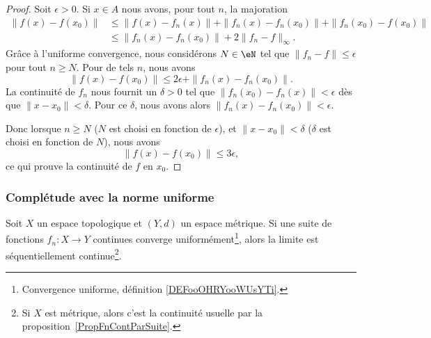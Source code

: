 \begin{proof}
	Soit \( \epsilon>0\). Si \( x\in A\) nous avons, pour tout \( n\), la majoration
	\begin{subequations}
		\begin{align}
			\| f(x)-f(x_0) \| & \leq \| f(x)-f_n(x) \|+\| f_n(x)-f_n(x_0) \|+\| f_n(x_0)-f(x_0) \| \\
			                  & \leq\| f_n(x)-f_n(x_0) \|+2\| f_n-f \|_{\infty}.
		\end{align}
	\end{subequations}
	Grâce à l'uniforme convergence, nous considérons \(N\in \eN\) tel que \( \| f_n-f \|\leq \epsilon\) pour tout \( n\geq N\). Pour de tels \( n\), nous avons
	\begin{equation}
		\| f(x)-f(x_0) \|\leq 2\epsilon+\| f_n(x)-f_n(x_0) \|.
	\end{equation}
	La continuité de \( f_n\) nous fournit un \( \delta>0\) tel que \( \| f_n(x_0)-f_n(x) \|<\epsilon\) dès que \( \| x-x_0 \|<\delta\). Pour ce \( \delta\), nous avons alors \( \| f_n(x)-f_n(x_0) \|<\epsilon\).

	Donc lorsque \( n\geq N\) (\( N\) est choisi en fonction de \( \epsilon\)), et \( \| x-x_0 \|<\delta\) (\( \delta\) est choisi en fonction de \( N\)), nous avons
	\begin{equation}
		\| f(x)-f(x_0) \|\leq 3\epsilon,
	\end{equation}
	ce qui prouve la continuité de \( f\) en \( x_0\).
\end{proof}

\subsubsection{Complétude avec la norme uniforme}

\begin{proposition}\label{PropCZslHBx}
	Soit \( X\) un espace topologique et \( (Y,d)\) un espace métrique. Si une suite de fonctions \( f_n\colon X\to Y\) continues converge uniformément\footnote{Convergence uniforme, définition \ref{DEFooOHRYooWUsYTi}.}, alors la limite est séquentiellement continue\footnote{Si \( X\) est métrique, alors c'est la continuité usuelle par la proposition~\ref{PropFnContParSuite}.}.
\end{proposition}

